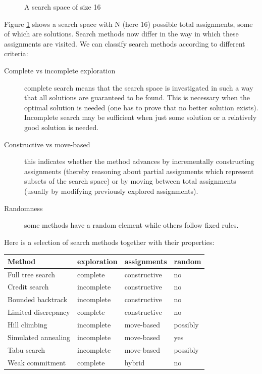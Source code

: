 \begin{figure}
\begin{center}
\end{center}
\caption{A search space of size 16}
\label{figsearchspace}
\end{figure}
Figure \ref{figsearchspace} shows a search space with N (here 16)
possible total assignments, some of which are solutions.
Search methods now differ in the way in which these assignments
are visited.
We can classify search methods according to different criteria:
\begin{description}
\item[Complete vs incomplete exploration] complete search means that the search space
    is investigated in such a way that all solutions are guaranteed to be found.
    This is necessary when the optimal solution is needed (one has to prove
    that no better solution exists). Incomplete search may be sufficient when
    just some solution or a relatively good solution is needed.
\item[Constructive vs move-based] this indicates whether the method advances
    by incrementally constructing assignments (thereby reasoning about partial
    assignments which represent subsets of the search space) or by moving
    between total assignments (usually by modifying previously explored
    assignments).
\item[Randomness] some methods have a random element while others follow
    fixed rules.
\end{description}
Here is a selection of search methods together with their properties:

\begin{center}
\begin{tabular}{|l|lll|}
\hline
Method&                 exploration&    assignments&    random\\
\hline
Full tree search&       complete&       constructive&   no\\
Credit search&          incomplete&     constructive&   no\\
Bounded backtrack&      incomplete&     constructive&   no\\
Limited discrepancy&    complete&       constructive&   no\\
Hill climbing&          incomplete&     move-based&     possibly\\
Simulated annealing&    incomplete&     move-based&     yes\\
Tabu search&            incomplete&     move-based&     possibly\\
Weak commitment&        complete&       hybrid&         no\\
\hline
\end{tabular}
\end{center}


